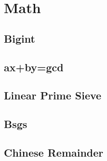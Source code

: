 \documentclass[a4paper,10pt,twocolumn,oneside]{article}
\begin{document}
%


%

%

%

\section{Math}

\subsection{Bigint}


\subsection{ax+by=gcd}


\subsection{Linear Prime Sieve}


\subsection{Bsgs}


\subsection{Chinese Remainder}

\end{document}
